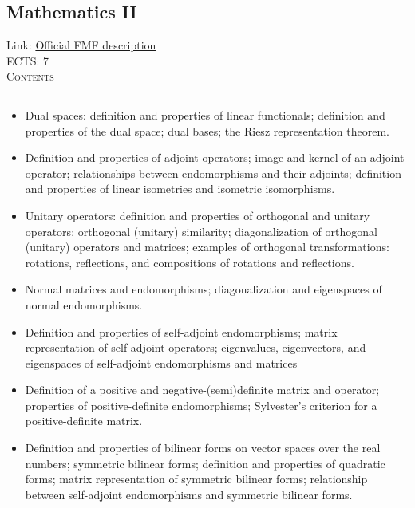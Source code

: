 \documentclass[11pt, a4paper]{article}
\newenvironment{course}[3]{
\subsection{#1}%
Link: \href{#2}{Official FMF description}\\%
ECTS: #3%
\vspace{1ex}
\\
{\large \textsc{Contents}}\\[-0.9ex]%
\rule{\textwidth}{0.5pt}
\vspace{-3ex}
}
{}
\newenvironment{chapter}[1]{
\begin{tcolorbox}[title=#1, breakable]
}
{\end{tcolorbox}}
\begin{document}
\begin{course}{Mathematics II}{https://www.fmf.uni-lj.si/en/study-physics/programmes/1fiz/2020/7000777/courses/521/}{7}
\begin{chapter}{Inner product spaces}
\begin{itemize}
            \item Dual spaces: definition and properties of linear functionals; definition and properties of the dual space; dual bases; the Riesz representation theorem.

        \end{itemize}
    \end{chapter}
        
    \begin{chapter}{Endomorphisms of inner product spaces}
        \begin{itemize}

            \item Definition and properties of adjoint operators; image and kernel of an adjoint operator; relationships between endomorphisms and their adjoints; definition and properties of linear isometries and isometric isomorphisms.

            \item Unitary operators: definition and properties of orthogonal and unitary operators; orthogonal (unitary) similarity; diagonalization of orthogonal (unitary) operators and matrices; examples of orthogonal transformations: rotations, reflections, and compositions of rotations and reflections.

            \item Normal matrices and endomorphisms; diagonalization and eigenspaces of normal endomorphisms.

            \item Definition and properties of self-adjoint endomorphisms; matrix representation of self-adjoint operators; eigenvalues, eigenvectors, and eigenspaces of self-adjoint endomorphisms and matrices

            \item Definition of a positive and negative-(semi)definite matrix and operator; properties of positive-definite endomorphisms; Sylvester's criterion for a positive-definite matrix.
        
        \end{itemize}
    \end{chapter}

    \begin{chapter}{Quadratic forms}
        \begin{itemize}
        
            \item Definition and properties of bilinear forms on vector spaces over the real numbers; symmetric bilinear forms; definition and properties of quadratic forms; matrix representation of symmetric bilinear forms; relationship between self-adjoint endomorphisms and symmetric bilinear forms.


\end{itemize}
\end{chapter}
\end{course}
\end{document}
